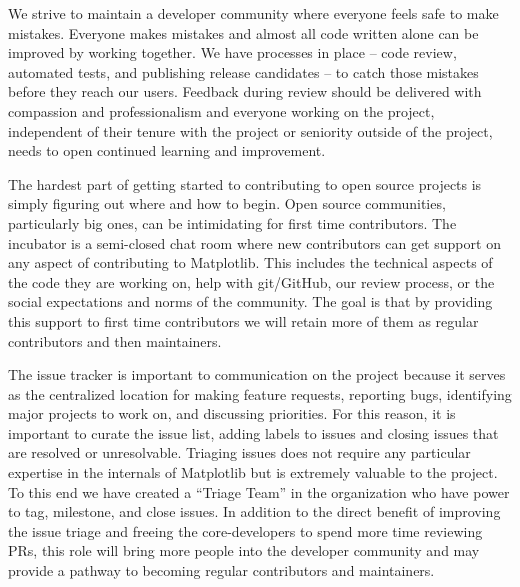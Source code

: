 \documentclass[12pt]{article}
\numberwithin{page}{section}
\begin{document}

We strive to maintain a developer community where everyone feels safe to make
mistakes. Everyone makes mistakes and almost all code written alone can be
improved by working together.  We have processes in place -- code review,
automated tests, and publishing release candidates -- to catch those mistakes
before they reach our users.  Feedback during review should be delivered with
compassion and professionalism and everyone working on the project, independent
of their tenure with the project or seniority outside of the project, needs to
open continued learning and improvement.



The hardest part of getting started to contributing to open source
projects is simply figuring out where and how to begin.  Open source communities,
particularly big ones, can be intimidating for first time
contributors.  The incubator is a semi-closed chat room where new
contributors can get support on any aspect of contributing to
Matplotlib.  This includes the technical aspects of the code they are
working on, help with git/GitHub, our review process, or the social
expectations and norms of the community.  The goal is that by
providing this support to first time contributors we will retain more
of them as regular contributors and then maintainers.

The issue tracker is important to communication on the project because
it serves as the centralized location for making feature requests,
reporting bugs, identifying major projects to work on, and discussing
priorities.  For this reason, it is important to curate the issue
list, adding labels to issues and closing issues that are resolved or
unresolvable. Triaging issues does not require any particular
expertise in the internals of Matplotlib but is extremely valuable to
the project.  To this end we have created a ``Triage Team'' in the
organization who have power to tag, milestone, and close issues.  In
addition to the direct benefit of improving the issue triage and
freeing the core-developers to spend more time reviewing PRs, this
role will bring more people into the developer community and may
provide a pathway to becoming regular contributors and maintainers.
\end{document}
